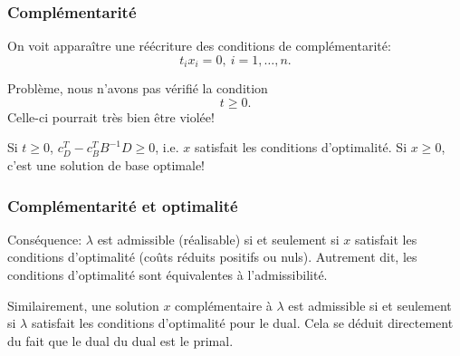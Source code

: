 \documentclass[usepdftitle=false]{beamer}
\begin{document}
\begin{frame}
	\frametitle{Complémentarité}
	
	On voit apparaître une réécriture des conditions de complémentarité:
	\[
	t_i x_i = 0,\ i = 1,\ldots,n.
	\]
	
	\mbox{}
	
	Problème, nous n'avons pas vérifié la condition
	$$
	t \geq 0.
	$$
	Celle-ci pourrait très bien être violée!
	
	\mbox{}
	
	Si $t \geq 0$, $c_D^T - c_B^TB^{-1}D \geq 0$, i.e. $x$ satisfait les conditions d'optimalité. Si $x \geq 0$, c'est une solution de base optimale!
	
\end{frame}

\begin{frame}
	\frametitle{Complémentarité et optimalité}
	
	Conséquence: $\lambda$ est admissible (réalisable) si et seulement si $x$ satisfait les conditions d'optimalité (coûts réduits positifs ou nuls).
	Autrement dit, les conditions d'optimalité sont équivalentes à l'admissibilité.
	
	\mbox{}
	
	Similairement, une solution $x$ complémentaire à $\lambda$ est admissible si et seulement si $\lambda$ satisfait les conditions d’optimalité pour le dual. Cela se déduit directement du fait que le dual du dual est le primal.
	
\end{frame}
\end{document}
